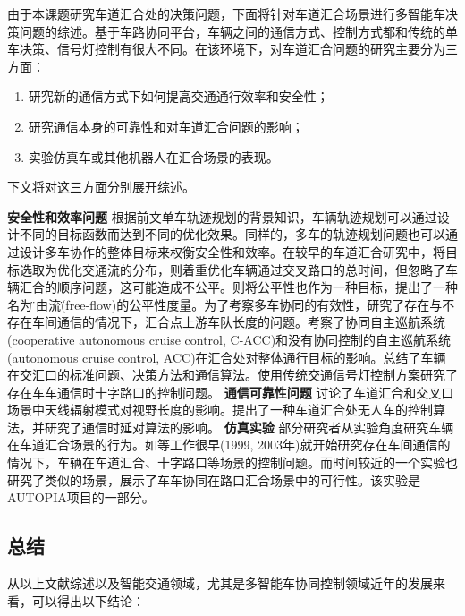 由于本课题研究车道汇合处的决策问题，下面将针对车道汇合场景进行多智能车决策问题的综述。基于车路协同平台，车辆之间的通信方式、控制方式都和传统的单车决策、信号灯控制有很大不同。在该环境下，对车道汇合问题的研究主要分为三方面：

\begin{enumerate}[label=(\arabic*),wide=\parindent]
\item 研究新的通信方式下如何提高交通通行效率和安全性；
\item 研究通信本身的可靠性和对车道汇合问题的影响；
\item 实验仿真车或其他机器人在汇合场景的表现。
\end{enumerate}

下文将对这三方面分别展开综述。


\textbf{安全性和效率问题 }
根据前文单车轨迹规划的背景知识，车辆轨迹规划可以通过设计不同的目标函数而达到不同的优化效果。同样的，多车的轨迹规划问题也可以通过设计多车协作的整体目标来权衡安全性和效率。在较早的车道汇合研究中，将目标选取为优化交通流的分布，则着重优化车辆通过交叉路口的总时间，但忽略了车辆汇合的顺序问题，这可能造成不公平。则将公平性也作为一种目标，提出了一种名为\"自由流\"(free-flow)的公平性度量。为了考察多车协同的有效性，研究了存在与不存在车间通信的情况下，汇合点上游车队长度的问题。考察了协同自主巡航系统(cooperative autonomous cruise control, C-ACC)和没有协同控制的自主巡航系统(autonomous cruise control, ACC)在汇合处对整体通行目标的影响。总结了车辆在交汇口的标准问题、决策方法和通信算法。\cite{Gradinescu2007Adaptive}使用传统交通信号灯控制方案研究了存在车车通信时十字路口的控制问题。
\textbf{通信可靠性问题 }
\cite{Abbas2013Radio}讨论了车道汇合和交叉口场景中天线辐射模式对视野长度的影响。提出了一种车道汇合处无人车的控制算法，并研究了通信时延对算法的影响。
\textbf{仿真实验 }
部分研究者从实验角度研究车辆在车道汇合场景的行为。如等工作很早(1999, 2003年)就开始研究存在车间通信的情况下，车辆在车道汇合、十字路口等场景的控制问题。而时间较近的一个实验\cite{Milanes2011Automated}也研究了类似的场景，展示了车车协同在路口汇合场景中的可行性。该实验是AUTOPIA\cite{Milan2011AUTOPIA}项目的一部分。

\subsection{总结}
从以上文献综述以及智能交通领域，尤其是多智能车协同控制领域近年的发展来看，可以得出以下结论：

